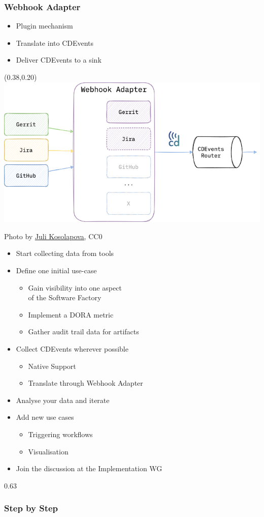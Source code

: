 \documentclass[aspectratio=169,11pt,hyperref={colorlinks=true}]{beamer}
\begin{document}
\begin{grayframe}
  \frametitle{Webhook Adapter}
  \begin{itemize}
    \item Plugin mechanism
    \item Translate into CDEvents
    \item Deliver CDEvents to a sink
  \end{itemize}
  \begin{textblock*}{0.60\paperwidth}(0.38\paperwidth,0.20\paperheight)
    \includegraphics[width=0.60\paperwidth]{img/cdevents-webhook_adapter.png}
  \end{textblock*}
\end{grayframe}

\begin{lgrayframerpic}{Photo by \href{https://unsplash.com/@yuli_superson}{\underline{Juli Kosolapova}}, CC0}%
  {%
  \begin{itemize}
    \item Start collecting data from tools
    \item Define one initial use-case
    \begin{itemize}
      \item Gain visibility into one aspect\\of the Software Factory
      \item Implement a DORA metric
      \item Gather audit trail data for artifacts
    \end{itemize}
    \item Collect CDEvents wherever possible
    \begin{itemize}
      \item Native Support
      \item Translate through Webhook Adapter
    \end{itemize}
    \item Analyse your data and iterate
    \item Add new use cases
    \begin{itemize}
      \item Triggering workflows
      \item Visualisation
    \end{itemize}
    \item Join the discussion at the Implementation WG
  \end{itemize}
  }%
  {0.63}
  \frametitle{Step by Step}
\end{lgrayframerpic}
\end{document}
